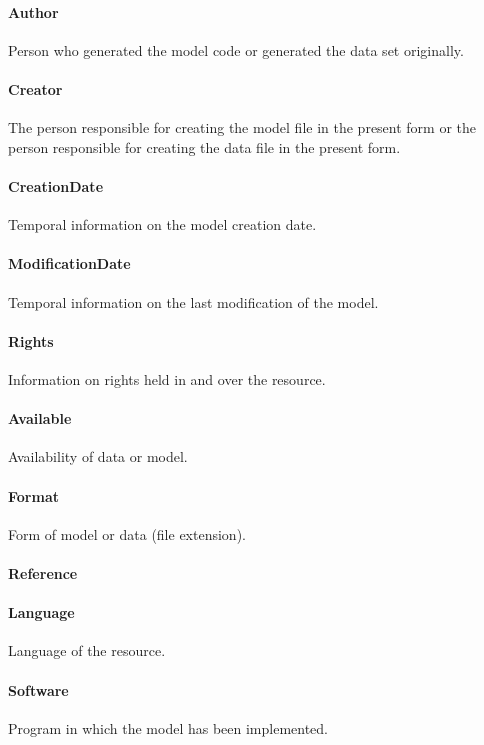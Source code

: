 \documentclass[a4paper]{report}
\begin{document}
\paragraph{Author}
Person who generated the model code or generated the data set originally.

\paragraph{Creator}
The person responsible for creating the model file in the present form or the person responsible for creating the data file in the present form.

\paragraph{CreationDate}
Temporal information on the model creation date.

\paragraph{ModificationDate}
Temporal information on the last modification of the model.

\paragraph{Rights}
Information on rights held in and over the resource.

\paragraph{Available}
Availability of data or model.

\paragraph{Format}
Form of model or data (file extension).

\paragraph{Reference}

\paragraph{Language}
Language of the resource.

\paragraph{Software}
Program in which the model has been implemented.
\end{document}
